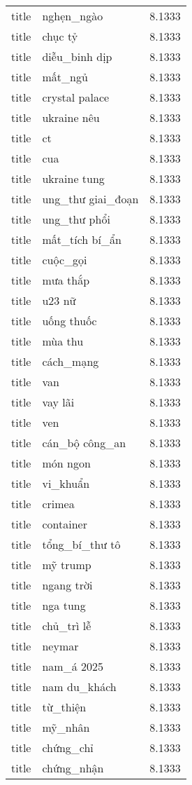 \documentclass{article}
\begin{document}
\begin{tabular}{lll}
title & nghẹn\_ngào & 8.1333\\
title & chục tỷ & 8.1333\\
title & diễu\_binh dịp & 8.1333\\
title & mất\_ngủ & 8.1333\\
title & crystal palace & 8.1333\\
title & ukraine nêu & 8.1333\\
title & ct & 8.1333\\
title & cua & 8.1333\\
title & ukraine tung & 8.1333\\
title & ung\_thư giai\_đoạn & 8.1333\\
title & ung\_thư phổi & 8.1333\\
title & mất\_tích bí\_ẩn & 8.1333\\
title & cuộc\_gọi & 8.1333\\
title & mưa thắp & 8.1333\\
title & u23 nữ & 8.1333\\
title & uống thuốc & 8.1333\\
title & mùa thu & 8.1333\\
title & cách\_mạng & 8.1333\\
title & van & 8.1333\\
title & vay lãi & 8.1333\\
title & ven & 8.1333\\
title & cán\_bộ công\_an & 8.1333\\
title & món ngon & 8.1333\\
title & vi\_khuẩn & 8.1333\\
title & crimea & 8.1333\\
title & container & 8.1333\\
title & tổng\_bí\_thư tô & 8.1333\\
title & mỹ trump & 8.1333\\
title & ngang trời & 8.1333\\
title & nga tung & 8.1333\\
title & chủ\_trì lễ & 8.1333\\
title & neymar & 8.1333\\
title & nam\_á 2025 & 8.1333\\
title & nam du\_khách & 8.1333\\
title & từ\_thiện & 8.1333\\
title & mỹ\_nhân & 8.1333\\
title & chứng\_chỉ & 8.1333\\
title & chứng\_nhận & 8.1333\\

\end{tabular}
\end{document}
